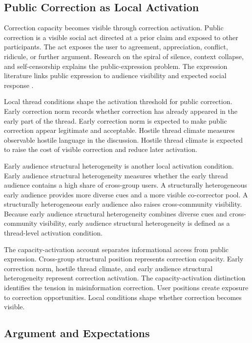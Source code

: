 \documentclass[namedate,unnumsec,webpdf,contemporary,large]{oup-authoring-template}
\begin{document}
\subsection{Public Correction as Local Activation}


Correction capacity becomes visible through correction activation. Public correction is a visible social act directed at a prior claim and exposed to other participants. The act exposes the user to agreement, appreciation, conflict, ridicule, or further argument. Research on the spiral of silence, context collapse, and self-censorship explains the public-expression problem. The expression literature links public expression to audience visibility and expected social response \citep{noelleneumann1974spiral,marwick2011tweet,hampton2014spiral}.

Local thread conditions shape the activation threshold for public correction. Early correction norm records whether correction has already appeared in the early part of the thread. Early correction norm is expected to make public correction appear legitimate and acceptable. Hostile thread climate measures observable hostile language in the discussion. Hostile thread climate is expected to raise the cost of visible correction and reduce later activation.

Early audience structural heterogeneity is another local activation condition. Early audience structural heterogeneity measures whether the early thread audience contains a high share of cross-group users. A structurally heterogeneous early audience provides more diverse cues and a more visible co-corrector pool. A structurally heterogeneous early audience also raises cross-community visibility. Because early audience structural heterogeneity combines diverse cues and cross-community visibility, early audience structural heterogeneity is defined as a thread-level activation condition.

The capacity-activation account separates informational access from public expression. Cross-group structural position represents correction capacity. Early correction norm, hostile thread climate, and early audience structural heterogeneity represent correction activation. The capacity-activation distinction identifies the tension in misinformation correction. User positions create exposure to correction opportunities. Local conditions shape whether correction becomes visible.

\subsection{Argument and Expectations}
\end{document}
